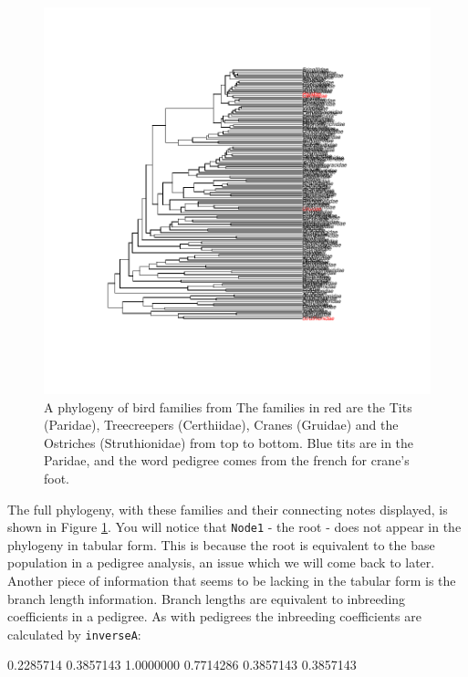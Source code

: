 \documentclass{article}
\begin{document}
\begin{figure}[!h]
\begin{center}
\includegraphics{Lecture6-006}
\end{center}
\caption{A phylogeny of bird families from \citet{Sibley.1990} The families in red are the Tits (Paridae), Treecreepers (Certhiidae),  Cranes (Gruidae)  and the Ostriches (Struthionidae) from top to bottom. Blue tits are in the Paridae, and the word pedigree comes from the french for crane's foot.}
\label{bird.families-fig}
\end{figure}

The full phylogeny, with these families and their connecting notes displayed, is shown in Figure \ref{bird.families-fig}. You will notice that \texttt{Node1} - the root - does not appear in the phylogeny in tabular form. This is because the root is equivalent to the base population in a pedigree analysis, an issue which we will come back to later. Another piece of information that seems to be lacking in the tabular form is the branch length information. Branch lengths are equivalent to inbreeding coefficients in a pedigree. As with pedigrees the inbreeding coefficients are calculated by \texttt{inverseA}:

\begin{Schunk}
\begin{Soutput}
[1] 0.2285714 0.3857143 1.0000000 0.7714286 0.3857143 0.3857143
\end{Soutput}
\end{Schunk}
\end{document}
